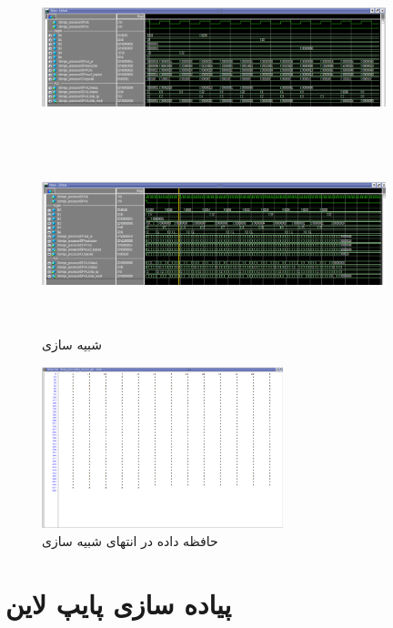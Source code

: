 \documentclass[11pt, a4paper]{article}
\begin{document}
	\begin{figure}[H]
		\begin{center}
			\includegraphics[width=10cm, height=5cm]{Photos/5.png}
			\includegraphics[width=10cm, height=5cm]{Photos/6.png}
		\end{center}
		\caption{شبیه سازی 
		}
		\label{Single_cycle_sim}
	\end{figure}
	
	\begin{figure}[H]
		\begin{center}
			\includegraphics[width=7cm]{Photos/9.png}
		\end{center}
		\caption{حافظه داده در انتهای شبیه سازی 
		}
		\label{Single_cycle_data_mem}
	\end{figure}
	
	
	\section{پیاده سازی پایپ لاین}
	
\end{document}
